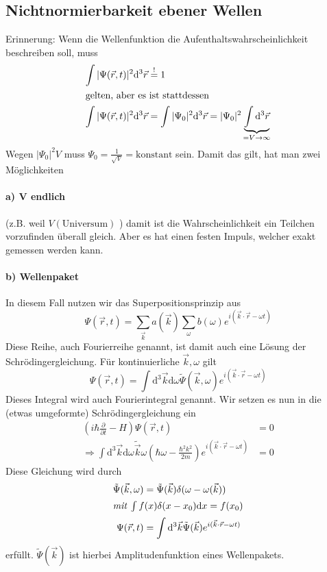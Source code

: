 \documentclass[oneside]{book}
\theoremstyle{definition}
\renewcommand{\d}{\mathrm d}
\newcommand{\fpartial}[1]{\frac{\partial}{\partial #1}}
\newcommand{\const}{\text{konstant}}
\begin{document}
\subsection{Nichtnormierbarkeit ebener Wellen}
Erinnerung: Wenn die Wellenfunktion die Aufenthaltswahrscheinlichkeit beschreiben soll, muss
\begin{align*}
\int |\Psi(\vec{r}, t)|^2 \d^3 \vec{r} &\overset!= 1\\
\intertext{gelten, aber es ist stattdessen}
\int |\Psi(\vec{r}, t)|^2 \d^3 \vec{r} &= \int |\Psi_0|^2 \d^3 \vec{r} = |\Psi_0|^2 \underbrace{\int \d^3 \vec{r}}_{=V \to \infty}
\end{align*}
Wegen $|\Psi_0|^2 V$ muss $\Psi_0 = \frac{1}{\sqrt V} = \const$ sein. Damit das gilt, hat man zwei Möglichkeiten
\paragraph{a) V endlich} (z.B. weil $V(\text{Universum})$ ) damit ist die Wahrscheinlichkeit ein Teilchen vorzufinden überall gleich. Aber es hat einen festen Impuls, welcher exakt gemessen werden kann.
\paragraph{b) \textbf{Wellenpaket}}
In diesem Fall nutzen wir das Superpositionsprinzip aus
$$\Psi(\vec{r}, t) = \sum_{\vec{k}} a (\vec{k}) \sum_{\omega} b(\omega) e^{i(\vec{k}\cdot \vec{r} - \omega t)}$$
Diese Reihe, auch Fourierreihe genannt, ist damit auch eine Lösung der Schrödingergleichung. Für kontinuierliche $\vec{k}, \omega$ gilt
$$\Psi(\vec{r}, t) = \int \d^3 \vec{k} \d \omega \tilde\Psi (\vec{k}, \omega) e^{i(\vec{k}\cdot \vec{r} - \omega t)}$$ Dieses Integral wird auch Fourierintegral genannt. Wir setzen es nun in die (etwas umgeformte) Schrödingergleichung ein
\begin{align*}
	(i \hbar \fpartial{t} - H) \Psi(\vec{r}, t) &= 0\\
	\Rightarrow \int \d^3 \vec{k} \d \omega \tilde{\vec{k}}\omega (\hbar \omega - \frac{\hbar^2 k^2}{2m}) e^{i(\vec{k}\cdot \vec{r} - \omega t)} &= 0
\end{align*}
Diese Gleichung wird durch
\begin{align*}
\tilde\Psi(\vec{k}, \omega) &= \tilde\Psi (\vec{k}) \delta(\omega - \omega(\vec k))\\
\intertext{\textit{mit} $\int f(x) \delta(x - x_0) \d x = f (x_0)$}
\Psi(\vec{r}, t) &= \int \d^3 \vec{k} \tilde{\Psi} (\vec{k}) e^{i(\vec{k}\cdot \vec{r} - \omega t)}
\end{align*}
erfüllt.
$\tilde \Psi(\vec{k})$ ist hierbei Amplitudenfunktion eines Wellenpakets.
\end{document}
